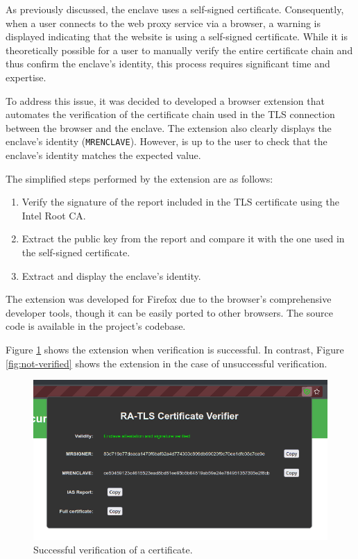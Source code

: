 As previously discussed, the enclave uses a self-signed certificate. Consequently, when a user connects to the web proxy service via a browser, a warning is displayed indicating that the website is using a self-signed certificate. While it is theoretically possible for a user to manually verify the entire certificate chain and thus confirm the enclave's identity, this process requires significant time and expertise.

To address this issue, it was decided to developed a browser extension that automates the verification of the certificate chain used in the TLS connection between the browser and the enclave. The extension also clearly displays the enclave's identity (\texttt{MRENCLAVE}). However, is up to the user to check that the enclave's identity matches the expected value.

The simplified steps performed by the extension are as follows:
\begin{enumerate}
    \item Verify the signature of the report included in the TLS certificate using the Intel Root CA.
    \item Extract the public key from the report and compare it with the one used in the self-signed certificate.
    \item Extract and display the enclave's identity.
\end{enumerate}

The extension was developed for Firefox due to the browser's comprehensive developer tools, though it can be easily ported to other browsers. The source code is available in the project's codebase.

Figure \ref{fig:verified} shows the extension when verification is successful. In contrast, Figure \ref{fig:not-verified} shows the extension in the case of unsuccessful verification.

\begin{figure}[h!]
    \centering
    \includegraphics[width=1\linewidth]{media/verified.png}
    \caption{Successful verification of a certificate.}
    \label{fig:verified}
\end{figure}

